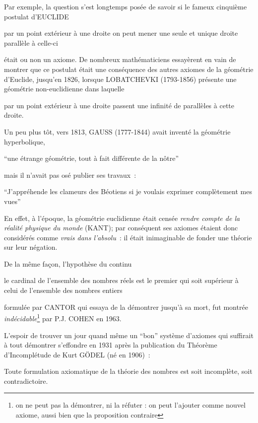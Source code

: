 Par exemple, la question s'est longtemps posée de savoir si le fameux cinquième postulat d'EUCLIDE
\begin{citation} par un point extérieur à une droite on peut mener une seule et unique droite parallèle à celle-ci
\end{citation}
 était ou non un axiome.
 De nombreux mathématiciens essayèrent en vain de montrer que ce postulat était une conséquence des autres axiomes de la géométrie d'Euclide, jusqu'en 1826, lorsque LOBATCHEVKI (1793-1856) présente une géométrie non-euclidienne dans laquelle 
\begin{citation} par un point extérieur à une droite passent une infinité de parallèles à cette droite.
\end{citation}
 Un peu plus t\^ot, vers 1813, GAUSS (1777-1844) avait inventé la
 géométrie hyperbolique, 
\begin{citation}
``une étrange géométrie,
 tout à fait différente de la n\^otre''
\end{citation} mais il n'avait pas
 osé publier ses travaux~: 
\begin{citation}
``J'appréhende les clameurs des
 Béotiens si je voulais exprimer complètement mes vues''
\end{citation}

 En
 effet, à l'époque, la géométrie euclidienne était censée {\em rendre
 compte de la réalité physique du monde} (KANT); par conséquent ses
 axiomes étaient donc considérés comme {\em vrais dans l'absolu}~: il
 était inimaginable de fonder une théorie sur leur négation.



De la m\^eme fa\c{c}on, l'hypothèse du continu 
\begin{citation} le cardinal de
l'ensemble des nombres réels est le premier qui soit supérieur à celui
de l'ensemble des nombres entiers
\end{citation}
 formulée par CANTOR qui essaya de
la démontrer jusqu'à sa mort, fut montrée
\emph{indécidable}\footnote{on ne peut pas la démontrer, ni la réfuter
: on peut l'ajouter comme nouvel axiome, aussi bien que la proposition
contraire} par P.J. COHEN en 1963.


L'espoir de trouver un jour quand m\^eme un ``bon'' système d'axiomes
qui suffirait à tout démontrer s'effondre en 1931 après la publication
du Théorème d'Incomplétude de Kurt G\"{O}DEL (né en 1906)~:
\begin{citation}
Toute formulation axiomatique de la théorie des nombres est soit incomplète, soit contradictoire.
\end{citation}


